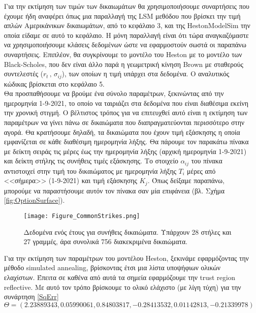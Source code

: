 \documentclass[12pt,a4paper,twoside,openany]{book}
\begin{document}
 	Για την εκτίμηση των τιμών των δικαιωμάτων θα χρησιμοποιήσουμε συναρτήσεις που έχουμε ήδη αναφέρει όπως μια παραλλαγή της LSM μεθόδου που βρίσκει την τιμή απλών Αμερικάνικων δικαιωμάτων, από το κεφάλαιο 3, και της HestonModelSim την οποία είδαμε σε αυτό το κεφάλαιο. Η μόνη παραλλαγή είναι ότι τώρα αναγκαζόμαστε να χρησιμοποιήσουμε κλάσεις δεδομένων ώστε να εφαρμοστούν σωστά οι παραπάνω συναρτήσεις. Επιπλέον, θα συγκρίνουμε το μοντέλο του Heston με το μοντέλο των Black-Scholes, που δεν είναι άλλο παρά η γεωμετρική κίνηση Brown με σταθερούς συντελεστές ($r_t \, ,\, \sigma_{ij}$), των οποίων η τιμή υπάρχει στα δεδομένα. Ο αναλυτικός κώδικας βρίσκεται στο κεφάλαιο 5.
 	\vspace{2.5mm}\\
 	Θα προσπαθήσουμε να βρούμε ένα σύνολο παραμέτρων, ξεκινώντας από την ημερομηνία 1-9-2021, το οποίο να ταιριάζει στα δεδομένα που είναι διαθέσιμα εκείνη την χρονική στιγμή. Ο βέλτιστος τρόπος για να επιτευχθεί αυτό είναι η εκτίμηση των παραμέτρων να γίνει πάνω σε δικαιώματα που διαπραγματεύονται περισσότερο στην αγορά. Θα κρατήσουμε δηλαδή, τα δικαιώματα που έχουν τιμή εξάσκησης η οποία εμφανίζεται σε κάθε διαθέσιμη ημερομηνία λήξης. Θα πάρουμε τον παρακάτω πίνακα με δείκτη σειράς τις μέρες έως την ημερομηνία λήξης (αρχική ημερομηνία 1-9-2021) και δείκτη στήλης τις συνήθεις τιμές εξάσκησης. Το στοιχείο $\alpha_{ij}$ του πίνακα αντιστοιχεί στην τιμή του δικαιώματος με ημερομηνία λήξης $T_i$ μέρες από <<σήμερα>> (1-9-2021) και τιμή εξάσκησης $K_j$. Όπως δείξαμε παραπάνω, μπορούμε να παραστήσουμε αυτόν τον πίνακα σαν μία επιφάνεια (βλ. Σχήμα \eqref{fig:OptionSurface}).
 	\begin{figure}[h]
 		\centering
 		\texttt{[image: Figure\_CommonStrikes.png]}
 		\caption{Δεδομένα ενός έτους για συνήθεις δικαιώματα. Υπάρχουν 28 στήλες και 27 γραμμές, άρα συνολικά 756 διακεκριμένα δικαιώματα.}
 		\label{fig:CommonStrikes}
 		\vspace{2mm}
 	\end{figure}
 	
 	\noindent Για την εκτίμηση των παραμέτρων του μοντέλου Heston, ξεκινάμε εφαρμόζοντας την μέθοδο simulated annealing, βρίσκοντας έτσι μια λίστα υποψήφιων ολικών ελαχίστων. Έπειτα σε καθένα από αυτά τα σημεία εφαρμόζουμε την trust region reflective. Με αυτό τον τρόπο βρίσκουμε το ολικό ελάχιστο (με λίγη τύχη) για την συνάρτηση \eqref{SqErr}
 	\[\Theta = (2.23889343, 0.05990061, 0.84803817, -0.28413532, 0.01142813, -0.21339978) \]
 	
\end{document}
